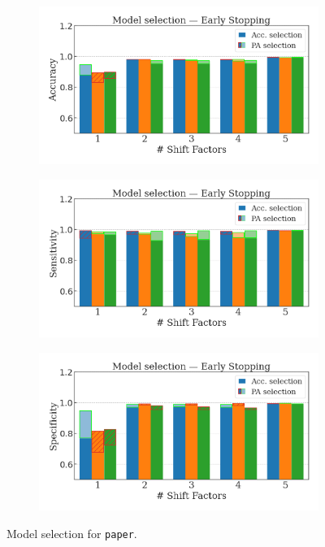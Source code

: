 \begin{figure}[H]
    \centering
    \begin{subfigure}[b]{0.32\textwidth}
        \centering
        \includegraphics[width=\textwidth]{img/results_discussion/datashift/paper_selection_ppred=1.0_met=acc.png}
    \end{subfigure}
    \hfill
    \begin{subfigure}[b]{0.32\textwidth}
        \centering
        \includegraphics[width=\textwidth]{img/results_discussion/datashift/paper_selection_ppred=1.0_met=sensitivity.png}
    \end{subfigure}
    \hfill
    \begin{subfigure}[b]{0.32\textwidth}
        \centering
        \vspace{-5pt}
        \includegraphics[width=\textwidth]{img/results_discussion/datashift/paper_selection_ppred=1.0_met=specificity.png}
    \end{subfigure}
    \caption{Model selection for \texttt{paper}.}
    \label{fig:gaussian_optimization}
\end{figure}



